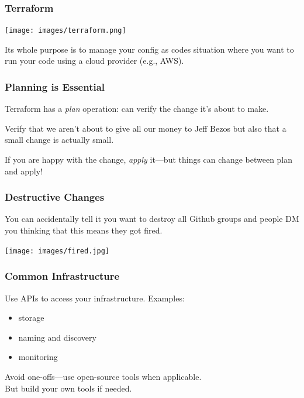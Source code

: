 \begin{frame}
\frametitle{Terraform}

\begin{center}
	\texttt{[image: images/terraform.png]}
\end{center}

Its whole purpose is to manage your config as codes
situation where you want to run your code using a cloud provider (e.g., AWS).

\end{frame}


\begin{frame}
\frametitle{Planning is Essential}

Terraform has a \emph{plan} operation: can verify the change it's about to make. 

Verify that we aren't about to give all our money to Jeff Bezos but also that a small change is actually small.

If you are happy with the change, \emph{apply} it---but things can change between plan and apply!

\end{frame}


\begin{frame}
\frametitle{Destructive Changes}

You can accidentally tell it you want to destroy all Github groups and people DM you thinking that this means they got fired.

\begin{center}
	\texttt{[image: images/fired.jpg]}
\end{center}

\end{frame}

\begin{frame}
\frametitle{Common Infrastructure}

\large

Use APIs to access your infrastructure. Examples:

\begin{itemize}
\item storage
\item naming and discovery
\item monitoring
\end{itemize}

Avoid one-offs---use open-source tools when applicable.\\
But build your own tools if needed.


\end{frame}

